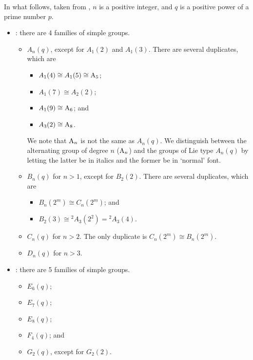 In what follows, taken from \cite{wikipedia_list-of-simple-groups}, $n$ is a positive integer, and $q$ is a positive power of a prime number $p$.
\begin{itemize}
    \item {}: there are 4 families of simple groups.
    \begin{itemize}
        \item $A_n(q)$, except for $A_1(2)$ and $A_1(3)$. There are several duplicates, which are
        \begin{itemize}
            \item $A_1(4) \cong A_1(5) \cong \mathrm{A}_{5}$;
            \item $A_1(7) \cong A_2(2)$;
            \item $A_1(9) \cong \mathrm{A}_{6}$; and
            \item $A_3(2) \cong \mathrm{A}_{8}$.
        \end{itemize}
        We note that $\mathrm{A}_{n}$ is not the same as $A_n(q)$. We distinguish between the alternating group of degree $n$ ($\mathrm{A}_{n}$) and the groups of Lie type $A_n(q)$ by letting the latter be in italics and the former be in `normal' font.

        \item $B_n(q)$ for $n > 1$, except for $B_2(2)$. There are several duplicates, which are
        \begin{itemize}
            \item $B_n(2^m) \cong C_n(2^m)$; and
            \item $B_2(3) \cong {^2A_3(2^2)} = {^2A_3(4)}$.
        \end{itemize}
        \item $C_n(q)$ for $n > 2$. The only duplicate is $C_n(2^m) \cong B_n(2^m)$.
        \item $D_n(q)$ for $n > 3$.
    \end{itemize}

    \item {}: there are 5 families of simple groups.
    \begin{itemize}
        \item $E_6(q)$;
        \item $E_7(q)$;
        \item $E_8(q)$;
        \item $F_4(q)$; and
        \item $G_2(q)$, except for $G_2(2)$.
    \end{itemize}


\end{itemize}

